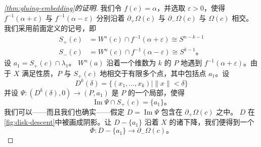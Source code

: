 \begin{proof}[\cref{thm:gluing-embedding}的证明]
我们令 $f(c)=\alpha$，并选取 $\varepsilon>0$，使得 $f^{-1}(\alpha+\varepsilon)$ 与 $f^{-1}(\alpha-\varepsilon)$ 分别沿着 $\partial_+\Omega(c)$ 与 $\partial_-\Omega(c)$ 与\trMorseChart{} $\Omega(c)$ 相交。我们采用前面定义的记号，即
\[
\begin{aligned}
S_+(c)&=W^s(c)\cap f^{-1}(\alpha+\varepsilon)\cong S^{n-k-1}\\
S_-(c)&=W^u(c)\cap f^{-1}(\alpha-\varepsilon)\cong S^{k-1}\text{。}
\end{aligned}
\]
设 $a_1=S_+(c)\cap\lambda_1$。\trUnstableManifold{} $W^u(a)$ 沿着一个维数为 $k$ 的\trSubmanifold{} $P$ \trTransverse{}地遇到 $f^{-1}(\alpha+\varepsilon)$。由于 $X$ 满足\trSmale{}性质，$P$ 与 $S_+(c)$ \trTransverse{}地相交于有限多个点，其中包括点 $a_1$。设
\[
D^k(\delta)=\{(x_1,\dotsc,x_k) \mid \|x\|<\delta\}
\]
并设 $\Psi\colon(D^k(\delta),0)\to(P,a_1)$ 是 $P$ 的一个局部\trParametrization，使得
\[
\operatorname{Im}\Psi\cap S_+(c)=\{a_1\}\text{。}
\]
我们可以——而且我们也确实——假定 $D=\operatorname{Im}\Psi$ 包含在 $\partial_+\Omega(c)$ 之中。\trDisk{} $D$ 在\cref{fig:disk-descent}中被画成阴影。让 $D-\{a_1\}$ 沿着 $X$ 的诸\trTrajectory{}下降，我们便得到一个\trEmbedding
\[
\Phi\colon D-\{a_1\}\longrightarrow\partial_-\Omega(c)\text{。}
\]


\end{proof}
